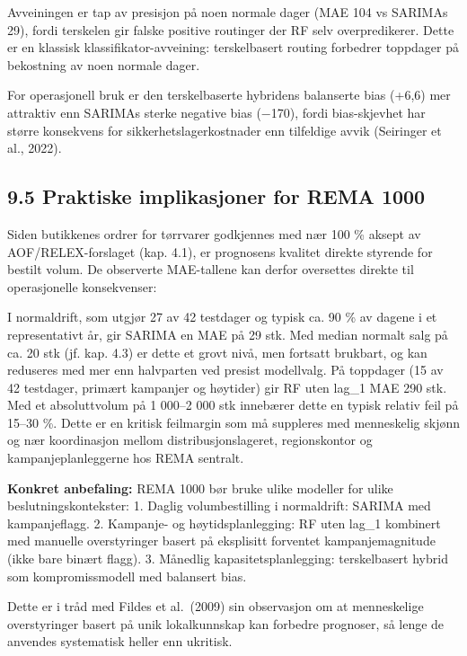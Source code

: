 \documentclass[
  norsk,
  11pt,
  a4paper,
]{article}
\begin{document}
Avveiningen er tap av presisjon på noen normale dager (MAE 104 vs
SARIMAs 29), fordi terskelen gir falske positive routinger der RF selv
overpredikerer. Dette er en klassisk klassifikator-avveining:
terskelbasert routing forbedrer toppdager på bekostning av noen normale
dager.

For operasjonell bruk er den terskelbaserte hybridens balanserte bias
(+6,6) mer attraktiv enn SARIMAs sterke negative bias (−170), fordi
bias-skjevhet har større konsekvens for sikkerhetslagerkostnader enn
tilfeldige avvik (Seiringer et al., 2022).

\subsection{9.5 Praktiske implikasjoner for REMA
1000}\label{praktiske-implikasjoner-for-rema-1000}

Siden butikkenes ordrer for tørrvarer godkjennes med nær 100 \% aksept
av AOF/RELEX-forslaget (kap. 4.1), er prognosens kvalitet direkte
styrende for bestilt volum. De observerte MAE-tallene kan derfor
oversettes direkte til operasjonelle konsekvenser:

I normaldrift, som utgjør 27 av 42 testdager og typisk ca. 90 \% av
dagene i et representativt år, gir SARIMA en MAE på 29 stk. Med median
normalt salg på ca. 20 stk (jf. kap. 4.3) er dette et grovt nivå, men
fortsatt brukbart, og kan reduseres med mer enn halvparten ved presist
modellvalg. På toppdager (15 av 42 testdager, primært kampanjer og
høytider) gir RF uten lag\_1 MAE 290 stk. Med et absoluttvolum på 1
000--2 000 stk innebærer dette en typisk relativ feil på 15--30 \%.
Dette er en kritisk feilmargin som må suppleres med menneskelig skjønn
og nær koordinasjon mellom distribusjonslageret, regionskontor og
kampanjeplanleggerne hos REMA sentralt.

\textbf{Konkret anbefaling:} REMA 1000 bør bruke ulike modeller for
ulike beslutningskontekster: 1. Daglig volumbestilling i normaldrift:
SARIMA med kampanjeflagg. 2. Kampanje- og høytidsplanlegging: RF uten
lag\_1 kombinert med manuelle overstyringer basert på eksplisitt
forventet kampanjemagnitude (ikke bare binært flagg). 3. Månedlig
kapasitetsplanlegging: terskelbasert hybrid som kompromissmodell med
balansert bias.

Dette er i tråd med Fildes et al.~(2009) sin observasjon om at
menneskelige overstyringer basert på unik lokalkunnskap kan forbedre
prognoser, så lenge de anvendes systematisk heller enn ukritisk.
\end{document}
